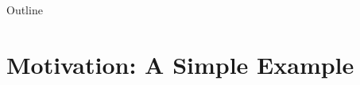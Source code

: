 
\begin{frame}
\titlepage
\end{frame}

\begin{frame}{Outline}
\tableofcontents
\end{frame}

\section{Motivation: A Simple Example}


